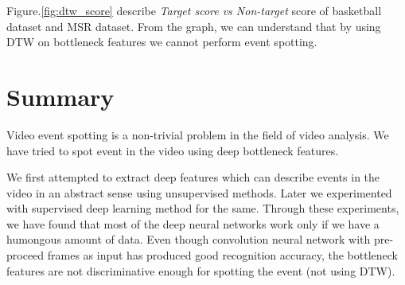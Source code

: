 Figure.\ref{fig:dtw_score} describe \textit{Target score vs Non-target} score of basketball dataset and MSR dataset.  From the graph, we can understand that by using DTW on bottleneck features we cannot perform event spotting.

\section{Summary}

Video event spotting is a non-trivial problem in the field of video analysis.  We have tried to spot event in the video using deep bottleneck features.

We first attempted to extract deep features which can describe events in the video in an abstract sense using unsupervised methods.  Later we experimented with supervised deep learning method for the same.  Through these experiments, we have found that most of the deep neural networks work only if we have a humongous amount of data.  Even though convolution neural network with pre-proceed frames as input has produced good recognition accuracy, the bottleneck features are not discriminative enough for spotting the event (not using DTW).